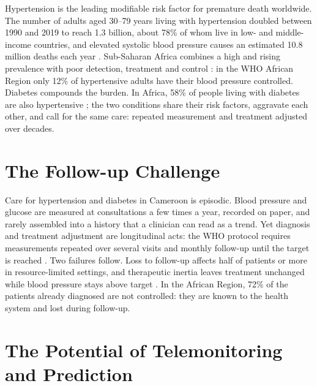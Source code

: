 \documentclass[11pt,a4paper,oneside]{report}
\begin{document}
Hypertension is the leading modifiable risk factor for premature death worldwide. The number of adults aged 30--79 years living with hypertension doubled between 1990 and 2019 to reach 1.3 billion, about 78\% of whom live in low- and middle-income countries, and elevated systolic blood pressure causes an estimated 10.8 million deaths each year \parencite{who2023hypertension}. Sub-Saharan Africa combines a high and rising prevalence with poor detection, treatment and control \parencite{gafane2024}: in the WHO African Region only 12\% of hypertensive adults have their blood pressure controlled. Diabetes compounds the burden. In Africa, 58\% of people living with diabetes are also hypertensive \parencite{hinneh2023}; the two conditions share their risk factors, aggravate each other, and call for the same care: repeated measurement and treatment adjusted over decades.

\section*{The Follow-up Challenge}

Care for hypertension and diabetes in Cameroon is episodic. Blood pressure and glucose are measured at consultations a few times a year, recorded on paper, and rarely assembled into a history that a clinician can read as a trend. Yet diagnosis and treatment adjustment are longitudinal acts: the WHO protocol requires measurements repeated over several visits and monthly follow-up until the target is reached \parencite{who2021guideline,who2023hypertension}. Two failures follow. Loss to follow-up affects half of patients or more in resource-limited settings, and therapeutic inertia leaves treatment unchanged while blood pressure stays above target \parencite{who2023hypertension}. In the African Region, 72\% of the patients already diagnosed are not controlled: they are known to the health system and lost during follow-up.

\section*{The Potential of Telemonitoring and Prediction}
\end{document}

